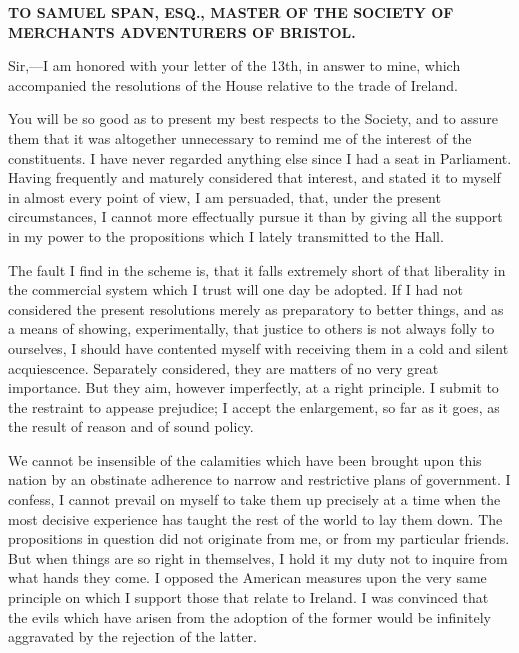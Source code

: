 \begin{center}
  \textbf{\large 
     TO SAMUEL SPAN, ESQ., MASTER OF THE SOCIETY OF MERCHANTS ADVENTURERS OF BRISTOL.
  } \par 
\end{center}

Sir,—I am honored with your letter of the 13th, in answer to mine, which accompanied the resolutions of the House relative to the trade of Ireland.

You will be so good as to present my best respects to the Society, and to assure them that it was altogether unnecessary to remind me of the interest of the constituents. I have never regarded anything else since I had a seat in Parliament. Having frequently and maturely considered that interest, and stated it to myself in almost every point of view, I am persuaded, that, under the present circumstances, I cannot more effectually pursue it than by giving all the support in my power to the propositions which I lately transmitted to the Hall.

The fault I find in the scheme is, that it falls extremely short of that liberality in the commercial system which I trust will one day be adopted. If I had not considered the present resolutions merely as preparatory to better things, and as a means of showing, experimentally, that justice to others is not always folly to ourselves, I should have contented myself with receiving them in a cold and silent acquiescence. Separately considered, they are matters of no very great importance. But they aim, however imperfectly, at a right principle. I submit to the restraint to appease prejudice; I accept the enlargement, so far as it goes, as the result of reason and of sound policy.

We cannot be insensible of the calamities which have been brought upon this nation by an obstinate adherence to narrow and restrictive plans of government. I confess, I cannot prevail on myself to take them up precisely at a time when the most decisive experience has taught the rest of the world to lay them down. The propositions in question did not originate from me, or from my particular friends. But when things are so right in themselves, I hold it my duty not to inquire from what hands they come. I opposed the American measures upon the very same principle on which I support those that relate to Ireland. I was convinced that the evils which have arisen from the adoption of the former would be infinitely aggravated by the rejection of the latter.

